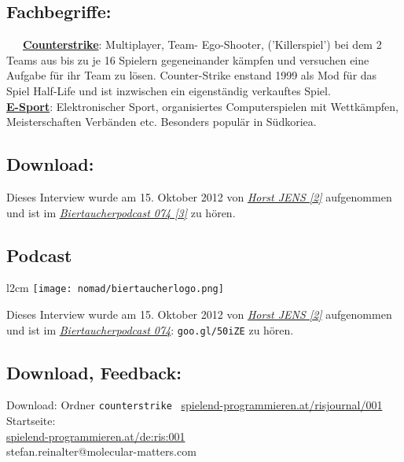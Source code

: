\documentclass[10pt,a4paper,ngerman,twoside]{article} %
\begin{document}
\subsection*{Fachbegriffe:}

~~~\href{http://de.wikipedia.org/wiki/Counter-Strike}{\textbf{Counterstrike}}: Multiplayer, Team- Ego-Shooter, ('Killerspiel') bei dem 2 Teams aus bis zu je 16 Spielern gegeneinander kämpfen und versuchen eine Aufgabe für ihr Team zu lösen. Counter-Strike enstand 1999 als Mod für das Spiel Half-Life und ist inzwischen ein eigenständig verkauftes Spiel.  \\

\href{http://de.wikipedia.org/wiki/E-Sport}{\textbf{E-Sport}}: Elektronischer Sport, organisiertes Computerspielen mit Wettkämpfen, Meisterschaften Verbänden etc. Besonders populär in Südkoriea. \\

\subsection*{Download:}
Dieses Interview  wurde am 15. Oktober 2012 von \href{http://spielend-programmieren.at}{\textit{Horst JENS [2]}} aufgenommen und ist im \href{http://spielend-programmieren.at/de:podcast:biertaucher:2012:074}{\textit{Biertaucherpodcast 074 [3]}} zu hören.  

\subsection*{Podcast}
\begin{wrapfigure}{l}{2cm}
\texttt{[image: nomad/biertaucherlogo.png]}
\end{wrapfigure}
Dieses Interview  wurde am 15. Oktober 2012 von \href{http://spielend-programmieren.at}{\textit{Horst JENS [2]}} aufgenommen und ist im \href{http://spielend-programmieren.at/de:podcast:biertaucher:2012:074}{\textit{Biertaucherpodcast 074}}: \texttt{goo.gl/50iZE} zu hören.

\subsection*{Download, Feedback:}
\footnotesize{
Download: Ordner \texttt{counterstrike} \Mundus\ \href{http://spielend-programmieren.at/risjournal/001}{spielend-programmieren.at/risjournal/001}\\
Startseite:\\
\href{http://spielend-programmieren.at/de:ris:001}{spielend-programmieren.at/de:ris:001}\\ 
\Letter\: stefan.reinalter@molecular-matters.com\\}
\normalsize 
\end{document}
